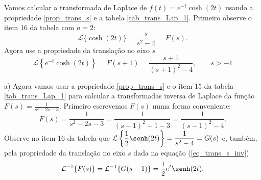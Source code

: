 \begin{ex}Vamos calcular a transformada de Laplace de $f(t)=e^{-t}\cosh(2t)$ usando a propriedade \ref{prop_trans_s} e a tabela \ref{tab_trans_Lap_1}. Primeiro observe o item 16 da tabela com $a=2$:
\begin{equation}
\mathcal{L}\{\cosh(2t)\}=\frac{s}{ s^2-4}=F(s).
\end{equation}
Agora use a propriedade da translação no eixo $s$
\begin{equation}
\mathcal{L}\left\{e^{-t}\cosh(2t)\right\} =F(s+1)=\frac{s+1}{ (s+1)^2-4},\qquad s>-1
\end{equation}
\end{ex}
\begin{ex}
 \item[a)] Agora vamos usar a propriedade \ref{prop_trans_s} e o item 15 da tabela \ref{tab_trans_Lap_1} para calcular a transformadas inversa de Laplace da função $F(s)=\frac{1}{s^2-2s-3}$. Primeiro escrevemos $F(s)$ numa forma conveniente:
\begin{equation}
F(s)=\frac{1}{s^2-2s-3}=\frac{1}{(s-1)^2-1-3}=\frac{1}{(s-1)^2-4}.
\end{equation}
Observe no item 16 da tabela que $\displaystyle\mathcal{L}\left\{\frac{1}{2}\senh(2t)\right\}=\frac{1}{ s^2-4}=G(s)$ e, também, pela propriedade da translação no eixo $s$ dada na equação (\ref{eq_trans_s_inv})
\begin{equation}
\mathcal{L}^{-1}\{F(s)\}=\mathcal{L}^{-1}\{G(s-1)\}=\frac{1}{2}e^{t}\senh(2t).
\end{equation}
\end{ex}
